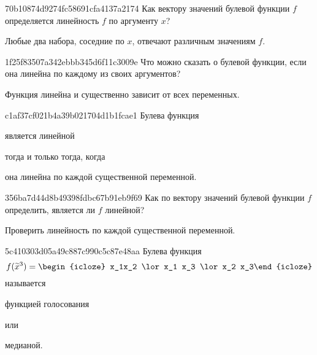 \begin{note}{70b10874d9274fc58691cfa4137a2174}
    Как вектору значений булевой функции \({ f }\) определяется линейность \({ f }\) по аргументу \({ x }\)?

    \begin{cloze}{1}
        Любые два набора, соседние по \({ x }\), отвечают различным значениям \({ f }\).
    \end{cloze}
\end{note}

\begin{note}{1f25f83507a342ebbb345d6f11c3009e}
    Что можно сказать о булевой функции, если она линейна по каждому из своих аргументов?

    \begin{cloze}{1}
        Функция линейна и существенно зависит от всех переменных.
    \end{cloze}
\end{note}

\begin{note}{c1af37cf021b4a39b021704d1b1fcae1}
    Булева функция \begin{icloze}{2}является линейной\end{icloze} \begin{icloze}{3}тогда и только тогда, когда\end{icloze} \begin{icloze}{1}она линейна по каждой существенной переменной.\end{icloze}
\end{note}

\begin{note}{356ba7d44d8b49398fdbc67b91eb9f69}
    Как по вектору значений булевой функции \({ f }\) определить, является ли \({ f }\) линейной?

    \begin{cloze}{1}
        Проверить линейность по каждой существенной переменной.
    \end{cloze}
\end{note}

\begin{note}{5c410303d05a49c887c990c5c87e48aa}
    Булева функция
    \[
        f(\widetilde x^{3}) = \begin{icloze}{2}x_1x_2 \lor x_1 x_3 \lor x_2 x_3\end{icloze}
    \]
    называется \begin{icloze}{1}функцией голосования\end{icloze} или \begin{icloze}{1}медианой.\end{icloze}
\end{note}

